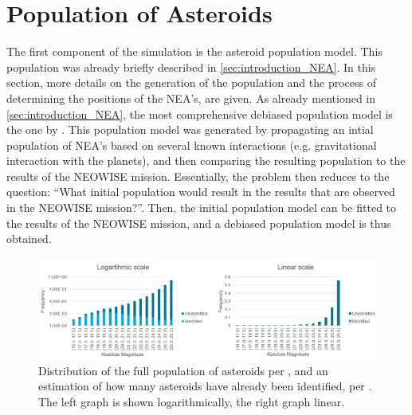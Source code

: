 \section{Population of Asteroids}
\label{sec:modelling_population}
The first component of the simulation is the asteroid population model. This population was already briefly described in \autoref{sec:introduction_NEA}. In this section, more details on the generation of the population and the process of determining the positions of the NEA's, are given. As already mentioned in \autoref{sec:introduction_NEA}, the most comprehensive debiased population model is the one by \cite{GranvikPopulation}. This population model was generated by propagating an intial population of NEA's based on several known interactions (e.g. gravitational interaction with the planets), and then comparing the resulting population to the results of the NEOWISE mission. Essentially, the problem then reduces to the question: ``What initial population would result in the results that are observed in the NEOWISE mission?''. Then, the initial population model can be fitted to the results of the NEOWISE mission, and a debiased population model is thus obtained. \\

\begin{figure}[htbp]
 \centering
 \includegraphics[width=1.0\textwidth]{img/population_identification_correction.png}
 \caption{Distribution of the full population of asteroids per \cite{GranvikPopulation}, and an estimation of how many asteroids have already been identified, per \cite{HarrisPopulation}. The left graph is shown logarithmically, the right graph linear.}
 \label{fig:populationcorrection}
\end{figure}


